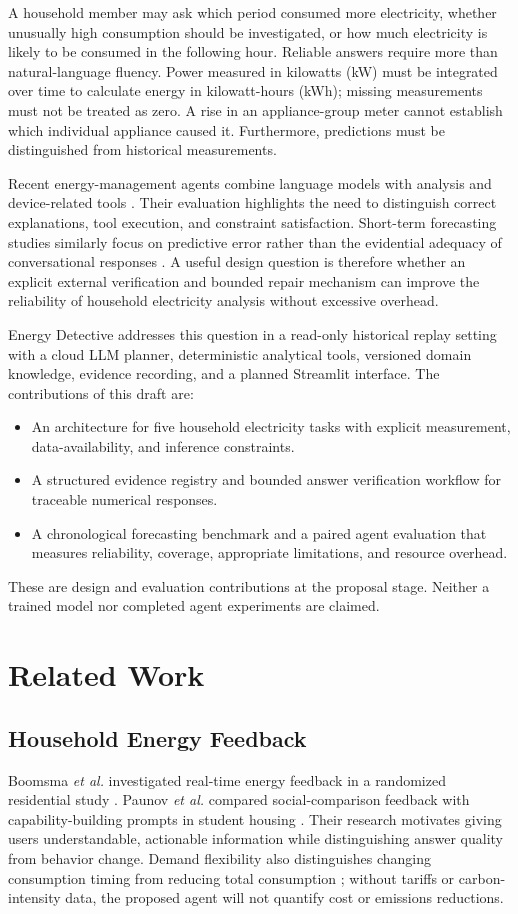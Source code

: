 \documentclass[conference]{IEEEtran}
\newcommand{\project}{Energy Detective}
\begin{document}
A household member may ask which period consumed more electricity, whether unusually high consumption should be investigated, or how much electricity is likely to be consumed in the following hour. Reliable answers require more than natural-language fluency. Power measured in kilowatts (kW) must be integrated over time to calculate energy in kilowatt-hours (kWh); missing measurements must not be treated as zero. A rise in an appliance-group meter cannot establish which individual appliance caused it. Furthermore, predictions must be distinguished from historical measurements.

Recent energy-management agents combine language models with analysis and device-related tools \cite{he2025,jonah2026}. Their evaluation highlights the need to distinguish correct explanations, tool execution, and constraint satisfaction. Short-term forecasting studies similarly focus on predictive error rather than the evidential adequacy of conversational responses \cite{muqtadir2025}. A useful design question is therefore whether an explicit external verification and bounded repair mechanism can improve the reliability of household electricity analysis without excessive overhead.

\project{} addresses this question in a read-only historical replay setting with a cloud LLM planner, deterministic analytical tools, versioned domain knowledge, evidence recording, and a planned Streamlit interface. The contributions of this draft are:
\begin{itemize}
\item An architecture for five household electricity tasks with explicit measurement, data-availability, and inference constraints.
\item A structured evidence registry and bounded answer verification workflow for traceable numerical responses.
\item A chronological forecasting benchmark and a paired agent evaluation that measures reliability, coverage, appropriate limitations, and resource overhead.
\end{itemize}
These are design and evaluation contributions at the proposal stage. Neither a trained model nor completed agent experiments are claimed.

\section{Related Work}
\subsection{Household Energy Feedback}
Boomsma \textit{et al.} investigated real-time energy feedback in a randomized residential study \cite{boomsma2025}. Paunov \textit{et al.} compared social-comparison feedback with capability-building prompts in student housing \cite{paunov2026}. Their research motivates giving users understandable, actionable information while distinguishing answer quality from behavior change. Demand flexibility also distinguishes changing consumption timing from reducing total consumption \cite{ieaflex2025}; without tariffs or carbon-intensity data, the proposed agent will not quantify cost or emissions reductions.
\end{document}

